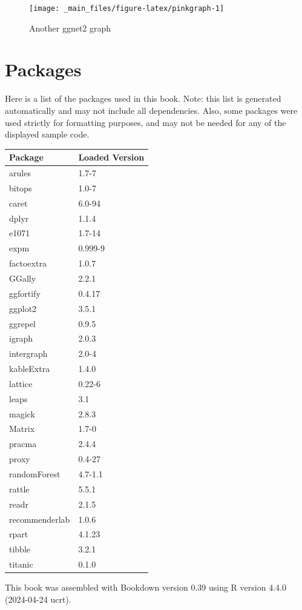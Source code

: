 \documentclass[
]{book}
\theoremstyle{definition}
\theoremstyle{definition}
\theoremstyle{definition}
\theoremstyle{definition}
\theoremstyle{remark}
\begin{document}
\begin{figure}

{\centering \texttt{[image: \_main\_files/figure-latex/pinkgraph-1]} 

}

\caption{Another ggnet2 graph}\label{fig:pinkgraph}
\end{figure}

\chapter{Packages}\label{packages}

Here is a list of the packages used in this book. Note: this list is generated automatically and may not include all dependencies. Also, some packages were used strictly for formatting purposes, and may not be needed for any of the displayed sample code.

\begin{longtable}{ll}
\toprule
Package & Loaded Version\\
\midrule
arules & 1.7-7\\
bitops & 1.0-7\\
caret & 6.0-94\\
dplyr & 1.1.4\\
e1071 & 1.7-14\\
expm & 0.999-9\\
factoextra & 1.0.7\\
GGally & 2.2.1\\
ggfortify & 0.4.17\\
ggplot2 & 3.5.1\\
ggrepel & 0.9.5\\
igraph & 2.0.3\\
intergraph & 2.0-4\\
kableExtra & 1.4.0\\
lattice & 0.22-6\\
leaps & 3.1\\
magick & 2.8.3\\
Matrix & 1.7-0\\
pracma & 2.4.4\\
proxy & 0.4-27\\
randomForest & 4.7-1.1\\
rattle & 5.5.1\\
readr & 2.1.5\\
recommenderlab & 1.0.6\\
rpart & 4.1.23\\
tibble & 3.2.1\\
titanic & 0.1.0\\
\bottomrule
\end{longtable}

This book was assembled with Bookdown version 0.39 using R version 4.4.0 (2024-04-24 ucrt).

\printbibliography

\printindex
\end{document}

